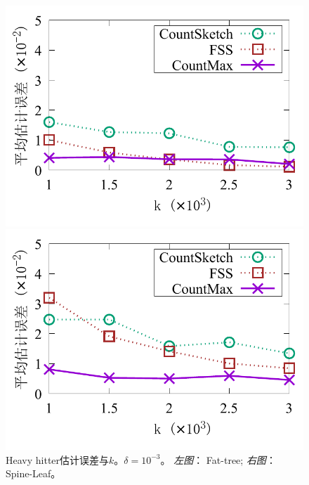 \begin{figure}[ht]
	\centering
	\begin{minipage}[t]{0.49\linewidth}
		\centering
		\includegraphics[width=\linewidth]{fig/ft_k_hh_10000.pdf}
	\end{minipage}\vspace{-0.6em}%
	\begin{minipage}[t]{0.49\linewidth}
		\centering
		\includegraphics[width=\linewidth]{fig/hy_k_hh_10000.pdf}
	\end{minipage}\vspace{-0.6em}%
	\caption{\textnormal{Heavy hitter估计误差与$k$。$\delta=10^{-3}$。 \textit{左图}： Fat-tree; \textit{右图}： Spine-Leaf。}}
	\label{fig:hh,k,10000}
\end{figure}

